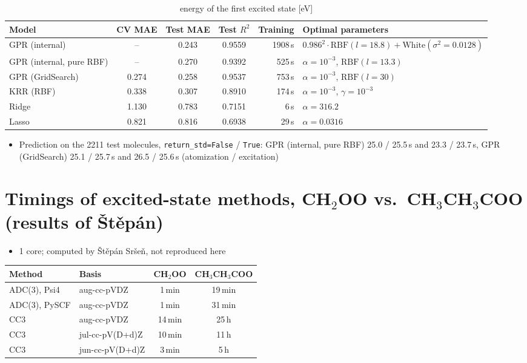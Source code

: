 \documentclass[11pt,a4paper]{article}
\begin{document}
\begin{table}[H]
\centering
\footnotesize
\setlength{\tabcolsep}{3pt}
\begin{tabular}{lcccrl}
\toprule
Model & CV MAE & Test MAE & Test $R^2$ & Training & Optimal parameters \\
\midrule
GPR (internal)           & --    & 0.243 & 0.9559 & 1908\,s & $0.986^2 \cdot \mathrm{RBF}(l{=}18.8) + \mathrm{White}(\sigma^2{=}0.0128)$ \\
GPR (internal, pure RBF) & --    & 0.270 & 0.9392 & 525\,s  & $\alpha = 10^{-3}$, $\mathrm{RBF}(l{=}13.3)$ \\
GPR (GridSearch)         & 0.274 & 0.258 & 0.9537 & 753\,s  & $\alpha = 10^{-3}$, $\mathrm{RBF}(l{=}30)$ \\
KRR (RBF)                & 0.338 & 0.307 & 0.8910 & 174\,s  & $\alpha = 10^{-3}$, $\gamma = 10^{-3}$ \\
Ridge                    & 1.130 & 0.783 & 0.7151 & 6\,s    & $\alpha = 316.2$ \\
Lasso                    & 0.821 & 0.816 & 0.6938 & 29\,s   & $\alpha = 0.0316$ \\
\bottomrule
\end{tabular}
\caption*{energy of the first excited state [eV]}
\end{table}

\begin{itemize}\itemsep2pt
  \item Prediction on the 2211 test molecules, \texttt{return\_std=False} / \texttt{True}: GPR (internal, pure RBF) 25.0 / 25.5\,s and 23.3 / 23.7\,s, GPR (GridSearch) 25.1 / 25.7\,s and 26.5 / 25.6\,s (atomization / excitation)
\end{itemize}

\section*{Timings of excited-state methods, CH$_2$OO vs.\ CH$_3$CH$_3$COO (results of Štěpán)}

\begin{itemize}\itemsep2pt
  \item 1 core; computed by Štěpán Sršeň, not reproduced here
\end{itemize}

\begin{table}[H]
\centering
\small
\begin{tabular}{llcc}
\toprule
Method & Basis & CH$_2$OO & CH$_3$CH$_3$COO \\
\midrule
ADC(3), Psi4  & aug-cc-pVDZ     & 1\,min  & 19\,min \\
ADC(3), PySCF & aug-cc-pVDZ     & 1\,min  & 31\,min \\
CC3           & aug-cc-pVDZ     & 14\,min & 25\,h \\
CC3           & jul-cc-pV(D+d)Z & 10\,min & 11\,h \\
CC3           & jun-cc-pV(D+d)Z & 3\,min  & 5\,h \\
\bottomrule
\end{tabular}
\end{table}
\end{document}
